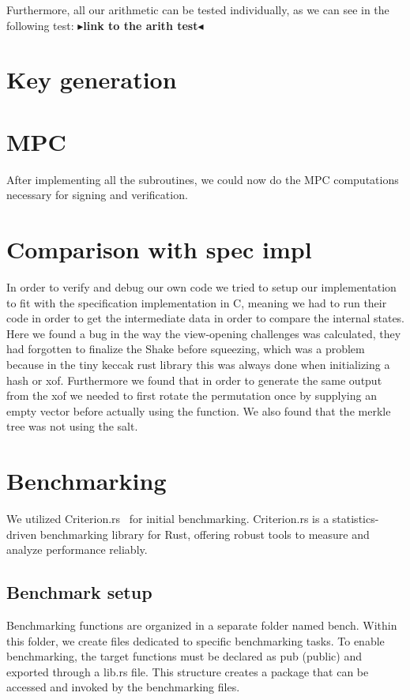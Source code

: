 \documentclass[twoside,11pt]{report}
\theoremstyle{definition}
\theoremstyle{plain}
\newcommand{\todo}[1]{{\color[rgb]{.5,0,0}\textbf{$\blacktriangleright$#1$\blacktriangleleft$}}}
\begin{document}
Furthermore, all our arithmetic can be tested individually, as we can see in the following test:
\todo{link to the arith test}
\section{Key generation}

\section{MPC}\label{sub:mpc_algo}
After implementing all the subroutines, we could now do the MPC computations necessary for signing and verification.

\section{Comparison with spec impl}\label{sub:comparison_with_spec_impl}
In order to verify and debug our own code we tried to setup our implementation to fit with the specification implementation in C, meaning we had to run their code in order to get the intermediate data in order to compare the internal states.
Here we found a bug in the way the view-opening challenges was calculated, they had forgotten to finalize the Shake before squeezing, which was a problem because in the tiny keccak rust library this was always done when initializing a hash or xof.
Furthermore we found that in order to generate the same output from the xof we needed to first rotate the permutation once by supplying an empty vector before actually using the function.
We also found that the merkle tree was not using the salt.

\section{Benchmarking}\label{sub:benchmarking} %
We utilized Criterion.rs~\cite{criterion} for initial benchmarking. Criterion.rs is a statistics-driven benchmarking library for Rust, offering robust tools to measure and analyze performance reliably.

\subsection{Benchmark setup}
Benchmarking functions are organized in a separate folder named bench. Within this folder, we create files dedicated to specific benchmarking tasks. To enable benchmarking, the target functions must be declared as pub (public) and exported through a lib.rs file. This structure creates a package that can be accessed and invoked by the benchmarking files.
\end{document}
